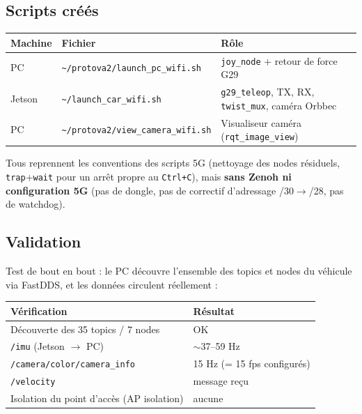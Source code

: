 \documentclass[a4paper,11pt]{article}
\begin{document}
\subsection{Scripts créés}
\begin{table}[H]
\centering
\begin{tabularx}{\textwidth}{@{}l l X@{}}
\toprule
\textbf{Machine} & \textbf{Fichier} & \textbf{Rôle} \\
\midrule
PC     & \texttt{\textasciitilde/protova2/launch\_pc\_wifi.sh}  & \texttt{joy\_node} + retour de force G29 \\
Jetson & \texttt{\textasciitilde/launch\_car\_wifi.sh}          & \texttt{g29\_teleop}, TX, RX, \texttt{twist\_mux}, caméra Orbbec \\
PC     & \texttt{\textasciitilde/protova2/view\_camera\_wifi.sh}& Visualiseur caméra (\texttt{rqt\_image\_view}) \\
\bottomrule
\end{tabularx}
\end{table}

\noindent Tous reprennent les conventions des scripts 5G (nettoyage des nodes
résiduels, \texttt{trap}+\texttt{wait} pour un arrêt propre au \texttt{Ctrl+C}),
mais \textbf{sans Zenoh ni configuration 5G} (pas de dongle, pas de correctif
d'adressage /30$\rightarrow$/28, pas de watchdog).

\subsection{Validation}
Test de bout en bout : le PC découvre l'ensemble des topics et nodes du
véhicule via FastDDS, et les données circulent réellement :
\begin{center}
\begin{tabular}{@{}ll@{}}
\toprule
Vérification & Résultat \\
\midrule
Découverte des 35 topics / 7 nodes & \textcolor{success}{OK} \\
\texttt{/imu} (Jetson $\rightarrow$ PC) & $\sim$37--59 Hz \\
\texttt{/camera/color/camera\_info} & 15 Hz (= 15 fps configurés) \\
\texttt{/velocity} & message reçu \\
Isolation du point d'accès (AP isolation) & aucune \\
\bottomrule
\end{tabular}
\end{center}
\end{document}
